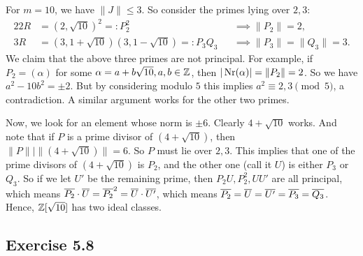 \documentclass[../Marcus.tex]{subfiles}
\begin{document}
For $m=10$, we have $\|J\| \leq 3$. So consider the primes lying over $2,3$:
\begin{alignat*}{2}
2R &= (2,\sqrt{10})^2 =: P_2^2  &&\implies \|P_2\| = 2,    \\
3R &= (3,1+\sqrt{10})(3,1-\sqrt{10}) =: P_3Q_3   &&\implies \|P_3\| = \|Q_3\| = 3.
\end{alignat*}
We claim that the above three primes are not principal. For example, if $P_2 = (\alpha)$ for some $\alpha=a+b\sqrt{10},a,b\in \mathbb{Z}$, then $|\operatorname{Nr}(\alpha)| = \|P_2\| = 2$. So we have $a^2-10b^2 = \pm2$. But by considering modulo $5$ this implies $a^2 \equiv 2,3 \pmod{5}$, a contradiction. A similar argument works for the other two primes.

Now, we look for an element whose norm is $\pm6$. Clearly $4+\sqrt{10}$ works. And note that if $P$ is a prime divisor of $(4+\sqrt{10})$, then $\|P\| \mid \|(4+\sqrt{10})\| = 6$. So $P$ must lie over $2,3$. This implies that one of the prime divisors of $(4+\sqrt{10})$ is $P_2$, and the other one (call it $U$) is either $P_3$ or $Q_3$. So if we let $U'$ be the remaining prime, then $P_2U,P_2^2,UU'$ are all principal, which means $\overline{P_2} \cdot \overline{U} = \overline{P_2}^2 = \overline{U} \cdot \overline{U'}$, which means $\overline{P_2} = \overline{U}= \overline{U'} = \overline{P_3} = \overline{Q_3}$. Hence, $\mathbb{Z}[\sqrt{10}]$ has two ideal classes.

\subsection*{Exercise 5.8}

\begin{comment}
For $m=223$, we have $\|J\| \leq 14$. So consider the primes lying over $2,3,5,7,11,13$:
\begin{align*}
2R &= (2,1+\sqrt{223})^2   \\
3R &= (3,1+\sqrt{223})(3,1-\sqrt{223})    \\
5R &= \text{prime}    \\
7R &= \text{prime}    \\
11R &= (11,5+\sqrt{223})(11,5-\sqrt{223})    \\
13R &= \text{ prime}
\end{align*}

We look for an element whose norm is $\pm2$: $15+\sqrt{223}$ works. So $\|(15+\sqrt{223})\| = 2$, which is a prime. This implies $(15+\sqrt{223})$ is a prime lying over $2$. Hence, $(2,1+\sqrt{223}) = (15+\sqrt{223})$ is principal.
\end{comment}
\end{document}
